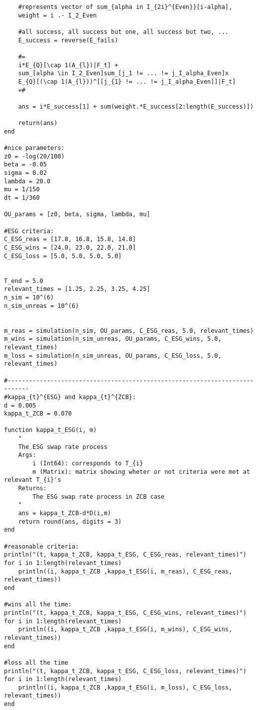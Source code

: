 \begin{verbatim}
    #represents vector of sum_{alpha in I_{2i}^{Even}}[i-alpha], 
    weight = i .- I_2_Even

    #all success, all success but one, all success but two, ... 
    E_success = reverse(E_fails)
    
    #=
    i*E_{Q}[\cap 1(A_{l})|F_t] + 
    sum_[alpha \in I_2_Even]sum_[j_1 != ... != j_I_alpha_Even]x
    E_{Q}[(\cap 1(A_{l}))^[[j_{1} != ... != j_I_alpha_Even]]|F_t] 
    =#

    ans = i*E_success[1] + sum(weight.*E_success[2:length(E_success)])

    return(ans)
end

#nice parameters:
z0 = -log(20/100)
beta = -0.05
sigma = 0.02
lambda = 20.0
mu = 1/150
dt = 1/360

OU_params = [z0, beta, sigma, lambda, mu]

#ESG criteria:
C_ESG_reas = [17.8, 16.8, 15.8, 14.8]
C_ESG_wins = [24.0, 23.0, 22.0, 21.0]
C_ESG_loss = [5.0, 5.0, 5.0, 5.0]


T_end = 5.0
relevant_times = [1.25, 2.25, 3.25, 4.25]
n_sim = 10^(6)
n_sim_unreas = 10^(6)


m_reas = simulation(n_sim, OU_params, C_ESG_reas, 5.0, relevant_times)
m_wins = simulation(n_sim_unreas, OU_params, C_ESG_wins, 5.0, relevant_times)
m_loss = simulation(n_sim_unreas, OU_params, C_ESG_loss, 5.0, relevant_times)

#----------------------------------------------------------------------------
#kappa_{t}^{ESG} and kappa_{t}^{ZCB}: 
d = 0.005
kappa_t_ZCB = 0.070

function kappa_t_ESG(i, m)
    " 
    The ESG swap rate process 
    Args: 
        i (Int64): corresponds to T_{i}
        m (Matrix): matrix showing wheter or not criteria were met at relevant T_{i}'s
    Returns: 
        The ESG swap rate process in ZCB case 
    "
    ans = kappa_t_ZCB-d*D(i,m)
    return round(ans, digits = 3)
end

#reasonable criteria:
println("(t, kappa_t_ZCB, kappa_t_ESG, C_ESG_reas, relevant_times)")
for i in 1:length(relevant_times)
    println((i, kappa_t_ZCB ,kappa_t_ESG(i, m_reas), C_ESG_reas, relevant_times))
end

#wins all the time:
println("(t, kappa_t_ZCB, kappa_t_ESG, C_ESG_wins, relevant_times)")
for i in 1:length(relevant_times)
    println((i, kappa_t_ZCB ,kappa_t_ESG(i, m_wins), C_ESG_wins, relevant_times))
end

#loss all the time
println("(t, kappa_t_ZCB, kappa_t_ESG, C_ESG_loss, relevant_times)")
for i in 1:length(relevant_times)
    println((i, kappa_t_ZCB ,kappa_t_ESG(i, m_loss), C_ESG_loss, relevant_times))
end


\end{verbatim}
